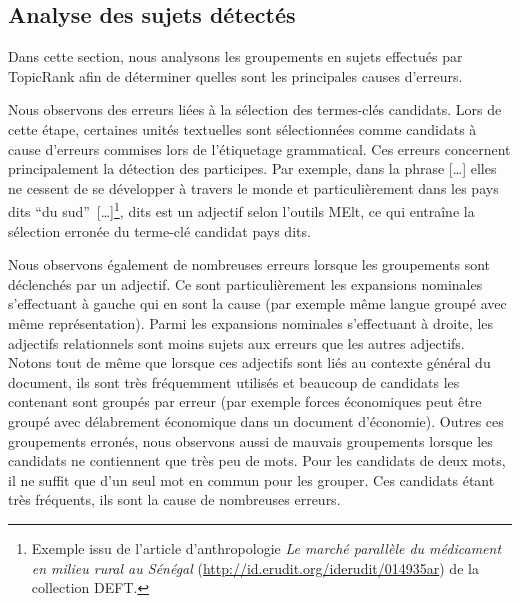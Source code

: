         \subsection{Analyse des sujets détectés}
        \label{subsec:main-automatic_keyphrase_annotation-unsupervised_automatic_keyphrase_extraction-error_analysis-detected_topics}
          Dans cette section, nous analysons les groupements en sujets effectués
          par Topic\-Rank afin de déterminer quelles sont les principales causes
          d'erreurs.

          Nous observons des erreurs liées à la sélection des termes-clés
          candidats. Lors de cette étape, certaines unités textuelles sont
          sélectionnées comme candidats à cause d'erreurs commises lors de
          l'étiquetage grammatical. Ces erreurs concernent principalement la
          détection des participes. Par exemple, dans la phrase \og{}[\dots]
          elles ne cessent de se développer à travers le monde et
          particulièrement dans les pays dits ``du
          sud''~[\dots]\fg{}\footnote{Exemple issu de l'article d'anthropologie
          \textit{Le marché parallèle du médicament en milieu rural au Sénégal}
          (\url{http://id.erudit.org/iderudit/014935ar}) de la collection
          DEFT.}, \og{}dits\fg{} est un adjectif selon l'outils MElt, ce qui
          entraîne la sélection erronée du terme-clé candidat \og{}pays
          dits\fg{}.

          Nous observons également de nombreuses erreurs lorsque les groupements
          sont déclenchés par un adjectif. Ce sont particulièrement les
          expansions nominales s'effectuant à gauche qui en sont la cause (par
          exemple \og{}même langue\fg{} groupé avec \og{}même
          représentation\fg{}). Parmi les expansions nominales s'effectuant à
          droite, les adjectifs relationnels sont moins sujets aux erreurs que
          les autres adjectifs. Notons tout de même que lorsque ces adjectifs
          sont liés au contexte général du document, ils sont très fréquemment
          utilisés et beaucoup de candidats les contenant sont groupés par
          erreur (par exemple \og{}forces économiques\fg{} peut être groupé
          avec \og{}délabrement économique\fg{} dans un document d'économie).
          Outres ces groupements erronés, nous observons aussi de mauvais
          groupements lorsque les candidats ne contiennent que très peu de mots.
          Pour les candidats de deux mots, il ne suffit que d'un seul mot en
          commun pour les grouper. Ces candidats étant très fréquents, ils sont
          la cause de nombreuses erreurs.

